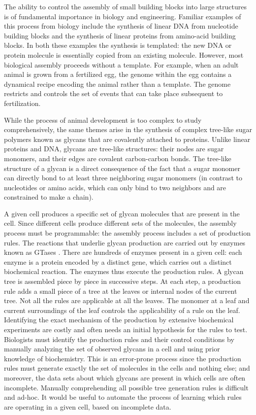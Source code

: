 The ability to control the assembly of small building blocks into large structures is of fundamental importance in biology and engineering. Familiar examples of this process from biology include the synthesis of linear DNA from nucleotide building blocks and the synthesis of linear proteins from amino-acid building blocks. In both these examples the synthesis is templated: the new DNA or protein molecule is essentially copied from an existing molecule. However, most biological assembly proceeds without a template. For example, when an adult animal is grown from a fertilized egg, the genome within the egg contains a dynamical recipe encoding the animal rather than a template. The genome restricts and controls the set of events that can take place subsequent to fertilization.

While the process of animal development is too complex to study comprehensively, the same themes arise in the synthesis of complex tree-like sugar polymers known as glycans \cite{Varki2017} that are covalently attached to proteins. Unlike linear proteins and DNA, glycans are tree-like structures: their nodes are sugar monomers, and their edges are covalent carbon-carbon bonds. The tree-like structure of a glycan is a direct consequence of the fact that a sugar monomer can directly bond to at least three neighboring sugar monomers (in contrast to nucleotides or amino acids, which can only bind to two neighbors and are constrained to make a chain).

A given cell produces a specific set of glycan molecules that are present in the cell. Since different cells produce different sets of the molecules,
the assembly process must be programmable: the assembly process includes a set of production rules. The reactions that underlie glycan production are carried out by enzymes known as GTases \cite{Varki2017}. There are hundreds of enzymes present in a given cell: each enzyme is a protein encoded by a distinct gene, which carries out a distinct biochemical reaction. The enzymes thus execute the production rules. A glycan tree is assembled piece by piece in successive steps. At each step, a production rule adds a small piece of a tree %
at the leaves or internal nodes of the current tree.
Not all the rules are applicable at all the leaves. The monomer at a leaf and current surroundings of the leaf controls
the applicability of a rule on the leaf.
Identifying the exact mechanism of the production by extensive
biochemical experiments are costly and often needs an initial
hypothesis for the rules to test. Biologists must identify the production rules and their control
conditions by manually analyzing the set of observed glycans in a cell
and using prior knowledge of biochemistry.
This is an error-prone process since the production rules must generate
exactly the set of molecules in the cells and nothing else; and moreover, the data sets about which glycans are present in which cells are often incomplete. Manually comprehending all possible tree generation rules is difficult and ad-hoc. It would be useful to automate the process of learning which rules are operating in a given cell, based on incomplete data. 

